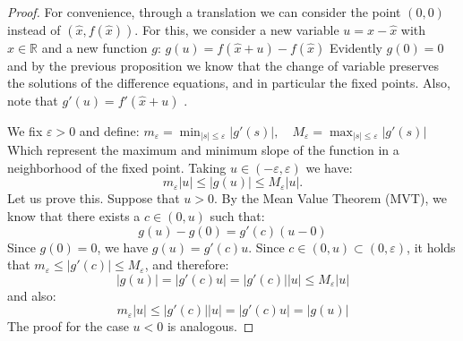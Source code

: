 \documentclass[12pt,a4paper]{report}
\theoremstyle{definition}
\begin{document}
\begin{proof}
For convenience, through a translation we can consider the point $(0,0)$ instead of $(\hat{x},f(\hat{x}))$. For this, we consider a new variable $ u = x - \hat{x}$ with $x \in \mathbb{R} $ and a new function $g$: 
$
g(u) = f(\hat{x} + u) - f(\hat{x}) 
$
%
Evidently $g(0)=0$ and by the previous proposition we know that the change of variable preserves the solutions of the difference equations, and in particular the fixed points. Also, note that $g'(u) = f'(\hat{x} + u)$ .
 
We fix $\varepsilon > 0 $ and define:
$
m_\varepsilon =  \min_{|s| \leq \varepsilon}|g'(s)|, \quad M_\varepsilon = \max_{|s| \leq \varepsilon}|g'(s) |
$
%
Which represent the maximum and minimum slope of the function in a neighborhood of the fixed point. Taking \( u \in (-\varepsilon,\varepsilon)\) we have:
\[
m_\varepsilon |u| \leq |g(u)| \leq M_\varepsilon |u|.
\]
%
Let us prove this. Suppose that \( u > 0 \). By the Mean Value Theorem (MVT), we know that there exists a \( c \in (0,u) \) such that:
\[
g(u) - g(0) = g'(c)(u - 0)
\]
%
Since \( g(0) = 0 \), we have \( g(u) = g'(c)u \). Since \( c \in (0,u) \subset (0,\varepsilon) \), it holds that \( m_\varepsilon \leq |g'(c)| \leq M_\varepsilon \), and therefore:
\[
|g(u)| = |g'(c)u| = |g'(c)| |u| \leq M_\varepsilon |u|
\]
%
and also:
\[
m_\varepsilon |u| \leq |g'(c)| |u| = |g'(c)u| = |g(u)|
\]
%
The proof for the case \( u < 0 \) is analogous.


\end{proof}
\end{document}
